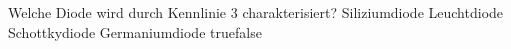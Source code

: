     {Welche Diode wird durch Kennlinie 3 charakterisiert?}
    {Siliziumdiode}
    {Leuchtdiode}
    {Schottkydiode}
    {Germaniumdiode}
    {true}{false}